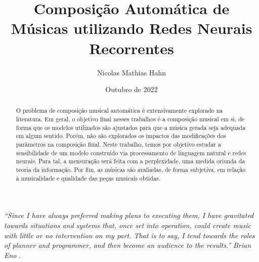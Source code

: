 \documentclass{automatextcc}
\begin{document}
\title{Composição Automática de Músicas utilizando Redes Neurais Recorrentes}
\author{Nicolas Mathias Hahn}



\dept{\DEST}

\date{Outubro de 2022}


\maketitulo

\makefolhaderosto

\makefolhadeaprovacaoA %


\newpage
\vspace*{\fill}
\begin{flushright} %
	\textit{``Since I have always preferred making plans to executing them, I have gravitated towards situations and systems that, once set into operation, could create music with little or no intervention on my part. That is to say, I tend towards the roles of planner and programmer, and then become an audience to the results.''} \newline
	\textit{Brian Eno \citep{alpern1995}}.
\end{flushright}




\begin{abstract}
O problema de composição musical automática é extensivamente  explorado na literatura. Em geral, o objetivo final nesses trabalhos é a composição musical em si, de forma que os modelos utilizados são ajustados para que a música gerada seja adequada em algum sentido. Porém, não são explorados os impactos das modificações dos parâmetros na composição final. Neste trabalho, temos por objetivo estudar a sensibilidade de um modelo construído via processamento de linguagem natural e redes neurais. Para tal, a mensuração será feita com a perplexidade, uma medida oriunda da teoria da informação. Por fim, as músicas são avaliadas, de forma subjetiva, em relação à musicalidade e qualidade das peças musicais obtidas.
\end{abstract}
\end{document}

